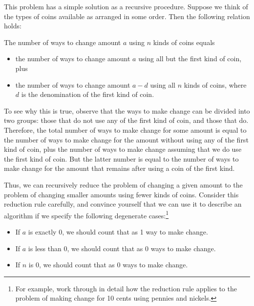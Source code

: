 This problem has a simple solution as a recursive procedure.  Suppose we think
of the types of coins available as arranged in some order.  Then the following
relation holds:

The number of ways to change amount \( a \) using \( n \) kinds of coins equals

\begin{itemize}

\item
the number of ways to change amount \( a \) using all but the first kind of coin,
plus

\item
the number of ways to change amount \( a - d \) using all \( n \) kinds of
coins, where \( d \) is the denomination of the first kind of coin.

\end{itemize}

\noindent
To see why this is true, observe that the ways to make change can be divided
into two groups: those that do not use any of the first kind of coin, and those
that do.  Therefore, the total number of ways to make change for some amount is
equal to the number of ways to make change for the amount without using any of
the first kind of coin, plus the number of ways to make change assuming that we
do use the first kind of coin.  But the latter number is equal to the number of
ways to make change for the amount that remains after using a coin of the first
kind.

Thus, we can recursively reduce the problem of changing a given amount to the
problem of changing smaller amounts using fewer kinds of coins.  Consider this
reduction rule carefully, and convince yourself that we can use it to describe
an algorithm if we specify the following degenerate cases:\footnote{For
example, work through in detail how the reduction rule applies to the problem
of making change for 10 cents using pennies and nickels.}

\begin{itemize}

\item
If \( a \) is exactly 0, we should count that as 1 way to make change.

\item
If \( a \) is less than 0, we should count that as 0 ways to make change.

\item
If \( n \) is 0, we should count that as 0 ways to make change.

\end{itemize}

